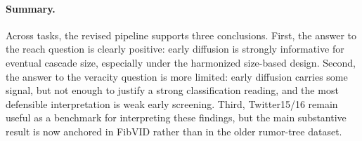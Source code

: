 \paragraph{Summary.}
Across tasks, the revised pipeline supports three conclusions. First, the answer to the reach question is clearly positive: early diffusion is strongly informative for eventual cascade size, especially under the harmonized size-based design. Second, the answer to the veracity question is more limited: early diffusion carries some signal, but not enough to justify a strong classification reading, and the most defensible interpretation is weak early screening. Third, Twitter15/16 remain useful as a benchmark for interpreting these findings, but the main substantive result is now anchored in FibVID rather than in the older rumor-tree dataset.
